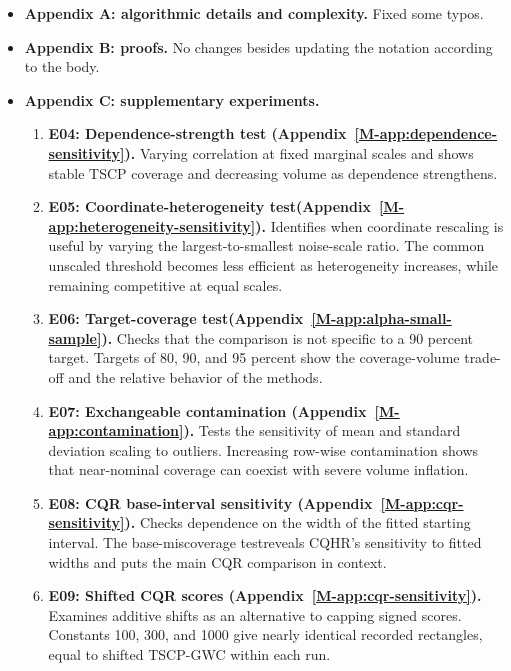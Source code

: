 \documentclass[10pt]{article}
\newcommand{\msapp}[1]{Appendix~\ref*{M-#1}}
\begin{document}
\begin{itemize}
\item \textbf{Appendix A: algorithmic details and complexity.} Fixed some typos.

\item \textbf{Appendix B: proofs.} No changes besides updating the notation according to the body.

\item \textbf{Appendix C: supplementary experiments.} 

\begin{enumerate}
    \item \textbf{E04: Dependence-strength test (\msapp{app:dependence-sensitivity}).}
Varying correlation at fixed marginal scales and shows stable TSCP coverage and decreasing volume as dependence strengthens.

\item \textbf{E05: Coordinate-heterogeneity test(\msapp{app:heterogeneity-sensitivity}).}
Identifies when coordinate rescaling is useful by varying the largest-to-smallest noise-scale ratio. The common unscaled threshold becomes less efficient as heterogeneity increases, while remaining competitive at equal scales.

\item \textbf{E06: Target-coverage test(\msapp{app:alpha-small-sample}).}
Checks that the comparison is not specific to a 90 percent target. Targets of 80, 90, and 95 percent show the coverage-volume trade-off and the relative behavior of the methods.

\item \textbf{E07: Exchangeable contamination (\msapp{app:contamination}).}
Tests the sensitivity of mean and standard deviation scaling to outliers. Increasing row-wise contamination shows that near-nominal coverage can coexist with severe volume inflation.

\item \textbf{E08: CQR base-interval sensitivity (\msapp{app:cqr-sensitivity}).}
Checks dependence on the width of the fitted starting interval. The base-miscoverage testreveals CQHR's sensitivity to fitted widths and puts the main CQR comparison in context.

\item \textbf{E09: Shifted CQR scores (\msapp{app:cqr-sensitivity}).}
Examines additive shifts as an alternative to capping signed scores. Constants 100, 300, and 1000 give nearly identical recorded rectangles, equal to shifted TSCP-GWC within each run.


\end{enumerate}
\end{itemize}
\end{document}
